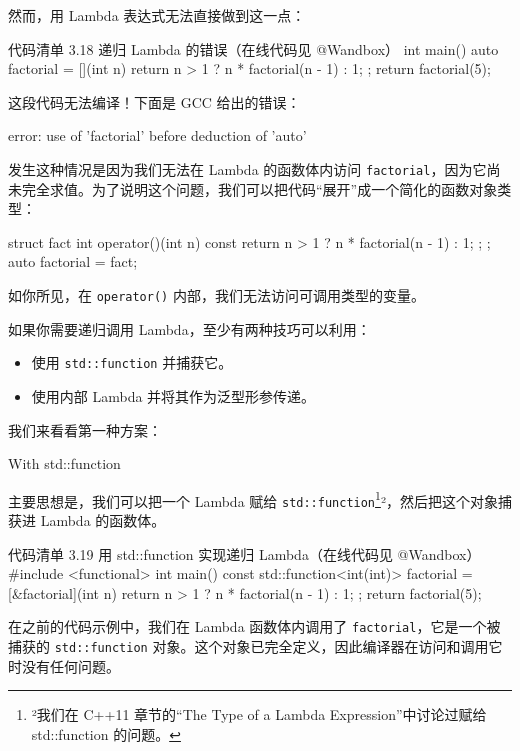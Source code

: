 然而，用 Lambda 表达式无法直接做到这一点：

\begin{codeboxt}{代码清单 3.18 递归 Lambda 的错误（在线代码见 @Wandbox）}
int main() {
auto factorial = [](int n) {
return n > 1 ? n * factorial(n - 1) : 1;
};
return factorial(5);
}
\end{codeboxt}

这段代码无法编译！下面是 GCC 给出的错误：

\begin{codebox}
error: use of 'factorial' before deduction of 'auto'
\end{codebox}

发生这种情况是因为我们无法在 Lambda 的函数体内访问 \texttt{factorial}，因为它尚未完全求值。为了说明这个问题，我们可以把代码“展开”成一个简化的函数对象类型：

\begin{codebox}
struct fact {
int operator()(int n) const {
return n > 1 ? n * factorial(n - 1) : 1;
};
};
auto factorial = fact{};
\end{codebox}

如你所见，在 \texttt{operator()} 内部，我们无法访问可调用类型的变量。

如果你需要递归调用 Lambda，至少有两种技巧可以利用：
\begin{itemize}
\item 使用 \texttt{std::function} 并捕获它。
\item 使用内部 Lambda 并将其作为泛型形参传递。
\end{itemize}

我们来看看第一种方案：

\begin{codebox}
With std::function
\end{codebox}

主要思想是，我们可以把一个 Lambda 赋给 \texttt{std::function}\footnote{²我们在 C++11 章节的“The Type of a Lambda Expression”中讨论过赋给 std::function 的问题。}²，然后把这个对象捕获进 Lambda 的函数体。

\begin{codeboxt}{代码清单 3.19 用 std::function 实现递归 Lambda（在线代码见 @Wandbox）}
#include <functional>
int main() {
const std::function<int(int)> factorial = [&factorial](int n) {
return n > 1 ? n * factorial(n - 1) : 1;
};
return factorial(5);
}
\end{codeboxt}

在之前的代码示例中，我们在 Lambda 函数体内调用了 \texttt{factorial}，它是一个被捕获的 \texttt{std::function} 对象。这个对象已完全定义，因此编译器在访问和调用它时没有任何问题。

